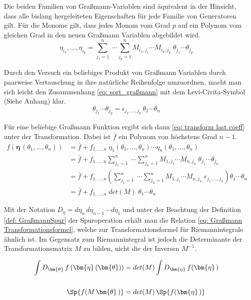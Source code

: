 \noindent Die beiden Familien von Graßmann-Variablen sind äquivalent in der Hinsicht, dass alle bislang hergeleiteten Eigenschaften für jede Familie von Generatoren gilt. Für die Monome gilt, dass jedes Monom vom Grad $p$ auf ein Polynom vom gleichen Grad in den neuen Graßmann Variablen abgebildet wird.
$$ \eta_{i_1}, \dots, \eta_{i_p} = \sum_{{j_1}=1}^n\;\cdots \sum_{{j_p}=1}^n M_{{i_1},{j_1}}\cdots M_{{i_p},{j_p}}\;\theta_{j_1} \cdots \theta_{j_p} $$

\noindent Durch den Versuch ein beliebiges Produkt von Graßmann Variablen durch paarweise Vertauschung in ihre natürliche Reihenfolge umzuordnen, macht man sich leicht den Zusammenhang \eqref{eq: sort_graßmann} mit dem Levi-Civita-Symbol (Siehe Anhang) klar.   
\begin{equation} \label{eq: sort_graßmann}
\theta_{j_1} \cdots \theta_{j_p} = \epsilon_{j_1,\dots,j_n} \, \theta_{1} \cdots \theta_{n}
\end{equation}

\noindent Für eine beliebige Graßmann Funktion ergibt sich dann \eqref{eq: transform last coeff} unter der Transformation. Dabei ist $\bar f$ ein Polynom von höchstens Grad $n-1$.
\begin{align}
f(\bm{\eta}\,(\theta_1, \dots, \theta_n))
&= \bar{f} + f_{1,\dots,n}\;\eta_1(\theta_1, \dots, \theta_n)\cdots\eta_n(\theta_1, \dots, \theta_n) \nonumber \\
&= \bar{f} + f_{1,\dots,n} \sum_{{j_1}=1}^n\;\cdots \sum_{{j_n}=1}^n M_{{1},{j_1}}\cdots M_{{n},{j_n}}\;\theta_{j_1} \cdots \theta_{j_n} \nonumber \\
&= \bar{f} + f_{1,\dots,n} \left(\sum_{{j_1}=1}^n\;\cdots \sum_{{j_n}=1}^n M_{{1},{j_1}}\cdots M_{{n},{j_n}}\; \epsilon_{j_1,\dots,j_n}\right) \theta_{1} \cdots \theta_{n} \nonumber \\
&= \bar{f} + f_{1,\dots,n} \; det(M) \; \theta_{1} \cdots \theta_{n} \label{eq: transform last coeff} 
\end{align}

\noindent Mit der Notation $D_{\eta} = d\eta_n\,d\eta_{n-1}\,\cdots d\eta_1 $ und unter der Beachtung der Definition \eqref{def: GraßmannSpur} der Spuroperation erhält man die Relation \eqref{eq: Graßmann Transformationsformel}, welche zur Transformationsformel für Riemannintegrale ähnlich ist. Im Gegensatz zum Riemannintegral ist jedoch die Determinante der Transformationsmatrix $M$ zu bilden, nicht die der Inversen $M^{-1}$. 
\begin{grayframe}[frametitle = {Für Variablentransformationen $\bm{\eta}\left(\bm{\theta}\right) = M\,\bm{\theta}$ gilt:}]
\begin{align} \label{eq: Graßmann Transformationsformel}
    \int D_{\bm{\theta}}\, f\left(\bm{\eta}\left(\bm{\theta}\right)\right)  &= det(M) \int D_{\bm{\eta}}\, f(\bm{\eta}\,) \\
    \nonumber \\
    \Sp{f( M\,\bm{\theta}\,)} &=  det(M) \,\Sp{f(\bm{\eta}\,)}
\end{align}
\end{grayframe}


